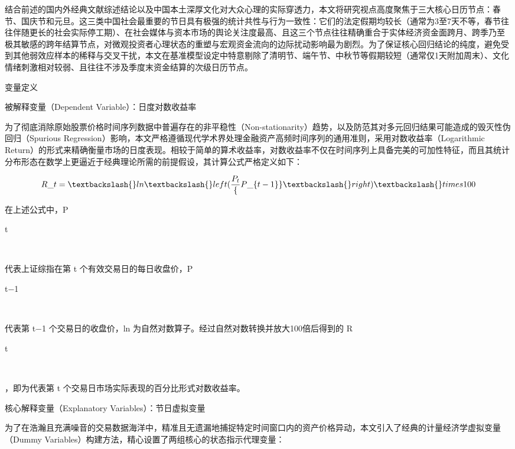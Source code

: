 \documentclass{cupb-thesis}
\begin{document}
结合前述的国内外经典文献综述结论以及中国本土深厚文化对大众心理的实际穿透力，本文将研究视点高度聚焦于三大核心日历节点：春节、国庆节和元旦。这三类中国社会最重要的节日具有极强的统计共性与行为一致性：它们的法定假期均较长（通常为3至7天不等，春节往往伴随更长的社会实际停工期）、在社会媒体与资本市场的舆论关注度最高、且这三个节点往往精确重合于实体经济资金面跨月、跨季乃至极其敏感的跨年结算节点，对微观投资者心理状态的重塑与宏观资金流向的边际扰动影响最为剧烈。为了保证核心回归结论的纯度，避免受到其他弱效应样本的稀释与交叉干扰，本文在基准模型设定中特意剔除了清明节、端午节、中秋节等假期较短（通常仅1天附加周末）、文化情绪刺激相对较弱、且往往不涉及季度末资金结算的次级日历节点。


变量定义

被解释变量（Dependent Variable）：日度对数收益率

为了彻底消除原始股票价格时间序列数据中普遍存在的非平稳性（Non-stationarity）趋势，以及防范其对多元回归结果可能造成的毁灭性伪回归（Spurious Regression）影响，本文严格遵循现代学术界处理金融资产高频时间序列的通用准则，采用对数收益率（Logarithmic Return）的形式来精确衡量市场的日度表现。相较于简单的算术收益率，对数收益率不仅在时间序列上具备完美的可加性特征，而且其统计分布形态在数学上更逼近于经典理论所需的前提假设，其计算公式严格定义如下：


\begin{equation}

R\_t = \textbackslash{}ln\textbackslash{}left(\frac{P_t}\{P\_\{t-1\}\}\textbackslash{}right) \textbackslash{}times 100

\end{equation}


在上述公式中，P

t

​

代表上证综指在第 t 个有效交易日的每日收盘价，P

t−1

​

代表第 t−1 个交易日的收盘价，ln 为自然对数算子。经过自然对数转换并放大100倍后得到的 R

t

​

，即为代表第 t 个交易日市场实际表现的百分比形式对数收益率。


核心解释变量（Explanatory Variables）：节日虚拟变量

为了在浩瀚且充满噪音的交易数据海洋中，精准且无遗漏地捕捉特定时间窗口内的资产价格异动，本文引入了经典的计量经济学虚拟变量（Dummy Variables）构建方法，精心设置了两组核心的状态指示代理变量：
\end{document}
